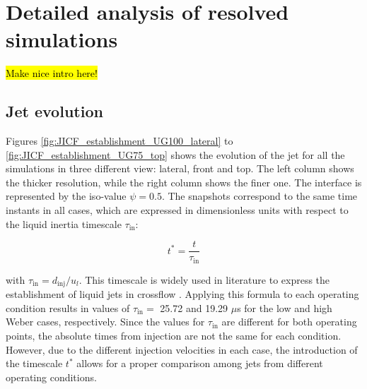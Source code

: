 \clearpage

\section{Detailed analysis of resolved  simulations}

\hl{Make nice intro here!}

\subsection{Jet evolution}
\label{subsec:ch5_jet_evolution}





Figures \ref{fig:JICF_establishment_UG100_lateral} to \ref{fig:JICF_establishment_UG75_top} shows the evolution of the jet for all the simulations in three different view: lateral, front and top. The left column shows the thicker resolution, while the right column shows the finer one. The interface is represented by the iso-value $\psi = 0.5$. The snapshots correspond to the same time instants in all cases, which are expressed in dimensionless units with respect to the liquid inertia timescale $\tau_\mathrm{in}$:

\begin{equation}
\label{eq:t_dimensionless_with_tau_in}
t^* = \frac{t}{\tau_\mathrm{in}}
\end{equation}

with $\tau_\mathrm{in} = d_\mathrm{inj}/u_l$. This timescale is widely used in literature to express the establishment of liquid jets in crossflow . Applying this formula to each operating condition results in values of $\tau_\mathrm{in} = $ 25.72 and 19.29 $\mu$s for the low and high Weber cases, respectively. Since the values for $\tau_\mathrm{in}$ are different for both operating points, the absolute times from injection are not the same for each condition. However, due to the different injection velocities in each case, the introduction of the timescale $t^*$ allows for a proper comparison among jets from different operating conditions.


